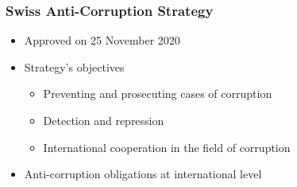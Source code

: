 \documentclass[11pt]{article}
\theoremstyle{definition}
\begin{document}
\subsubsection{Swiss Anti-Corruption Strategy}
\begin{itemize}
	\item Approved on 25 November 2020
	\item Strategy's objectives
	\begin{itemize}
		\item Preventing and prosecuting cases of corruption
		\item Detection and repression
		\item International cooperation in the field of corruption
	\end{itemize}
	\item Anti-corruption obligations at international level
\end{itemize}
\end{document}
